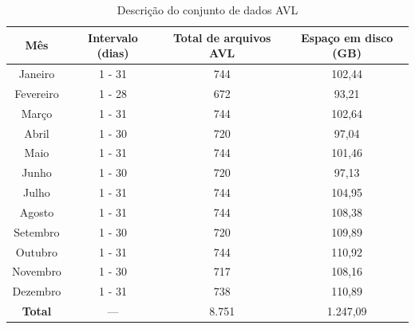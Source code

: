 \documentclass[
	12pt,				%
	oneside,			%
	a4paper,			%
	english,			%
	brazil				%
	]{abntex2ppgsi}
\begin{document}
{{\begin{table}[!htb]
\begin{threeparttable}
\centering
\caption{Descrição do conjunto de dados AVL}
\label{tab:avlDataset}
\begin{tabular}{ c | c | c | c }
\toprule
\textbf{Mês} & \textbf{Intervalo (dias)} & \textbf{Total de arquivos AVL} & \textbf{Espaço em disco (GB)} \\
\midrule
Janeiro\tnote{a} & 1 - 31 & 744 & 102,44 \\
\hline
 Fevereiro & 1 - 28 & 672 & 93,21 \\
\hline
 Março & 1 - 31 & 744 & 102,64 \\
\hline
 Abril & 1 - 30 & 720 & 97,04 \\
\hline
 Maio & 1 - 31 & 744 & 101,46 \\
\hline
 Junho & 1 - 30 & 720 & 97,13 \\
\hline
 Julho & 1 - 31 & 744 & 104,95 \\
\hline
 Agosto & 1 - 31 & 744 & 108,38 \\
\hline
 Setembro & 1 - 30 & 720 & 109,89 \\
\hline
 Outubro & 1 - 31 & 744 & 110,92 \\
\hline
 Novembro & 1 - 30 & 717 & 108,16 \\
\hline
 Dezembro & 1 - 31 & 738 & 110,89 \\
\midrule
\midrule
\textbf{Total} & --- & 8.751 & 1.247,09 \\
\bottomrule
\end{tabular}
\begin{tablenotes}

\end{tablenotes}
\end{threeparttable}
\end{table}}}
\end{document}
